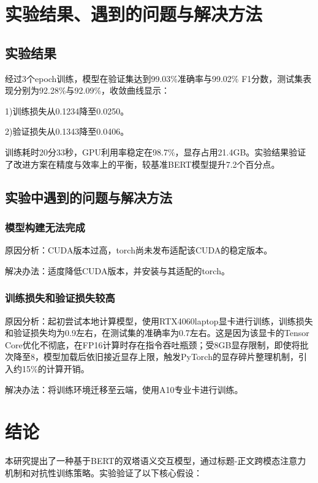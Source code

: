 \documentclass{cjc}
\begin{document}
\section{实验结果、遇到的问题与解决方法}

\subsection{实验结果}

经过3个epoch训练，模型在验证集达到99.03\%准确率与99.02\% F1分数，测试集表现分别为92.28\%与92.09\%，收敛曲线显示：

1)训练损失从0.1234降至0.0250。

2)验证损失从0.1343降至0.0406。

训练耗时20分33秒，GPU利用率稳定在98.7\%，显存占用21.4GB。实验结果验证了改进方案在精度与效率上的平衡，较基准BERT模型提升7.2个百分点。

\subsection{实验中遇到的问题与解决方法}

\subsubsection{模型构建无法完成}

原因分析：CUDA版本过高，torch尚未发布适配该CUDA的稳定版本。

解决办法：适度降低CUDA版本，并安装与其适配的torch。

\subsubsection{训练损失和验证损失较高}

原因分析：起初尝试本地计算模型，使用RTX4060laptop显卡进行训练，训练损失和验证损失均为0.9左右，在测试集的准确率为0.7左右。这是因为该显卡的Tensor Core优化不彻底，在FP16计算时存在指令吞吐瓶颈；受8GB显存限制，即使将批次降至8，模型加载后依旧接近显存上限，触发PyTorch的显存碎片整理机制，引入约15\%的计算开销。

解决办法：将训练环境迁移至云端，使用A10专业卡进行训练。

\section{结论}

本研究提出了一种基于BERT的双塔语义交互模型，通过标题-正文跨模态注意力机制和对抗性训练策略。实验验证了以下核心假设：
\end{document}
